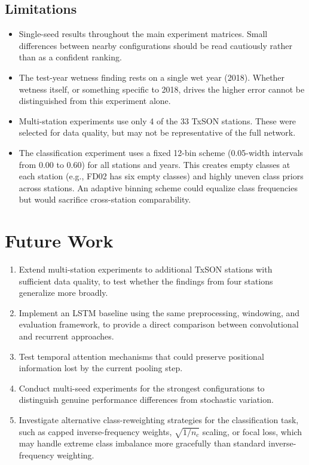 \documentclass[11pt]{article}
\begin{document}
\subsection{Limitations}

\begin{itemize}
    \item Single-seed results throughout the main experiment matrices. Small
    differences between nearby configurations should be read cautiously rather than
    as a confident ranking.
    \item The test-year wetness finding rests on a single wet year (2018). Whether
    wetness itself, or something specific to 2018, drives the higher error cannot
    be distinguished from this experiment alone.
    \item Multi-station experiments use only 4 of the 33 TxSON stations. These were
    selected for data quality, but may not be representative of the full network.
    \item The classification experiment uses a fixed 12-bin scheme (0.05-width
    intervals from 0.00 to 0.60) for all stations and years. This creates empty
    classes at each station (e.g., FD02 has six empty classes) and highly uneven
    class priors across stations. An adaptive binning scheme could equalize class
    frequencies but would sacrifice cross-station comparability.
\end{itemize}

\section{Future Work}

\begin{enumerate}
    \item Extend multi-station experiments to additional TxSON stations with
    sufficient data quality, to test whether the findings from four stations
    generalize more broadly.
    \item Implement an LSTM baseline using the same preprocessing, windowing, and
    evaluation framework, to provide a direct comparison between convolutional and
    recurrent approaches.
    \item Test temporal attention mechanisms that could preserve positional
    information lost by the current pooling step.
    \item Conduct multi-seed experiments for the strongest configurations to
    distinguish genuine performance differences from stochastic variation.
    \item Investigate alternative class-reweighting strategies for the
    classification task, such as capped inverse-frequency weights,
    $\sqrt{1/n_c}$ scaling, or focal loss, which may handle extreme class
    imbalance more gracefully than standard inverse-frequency weighting.
\end{enumerate}



\end{document}
